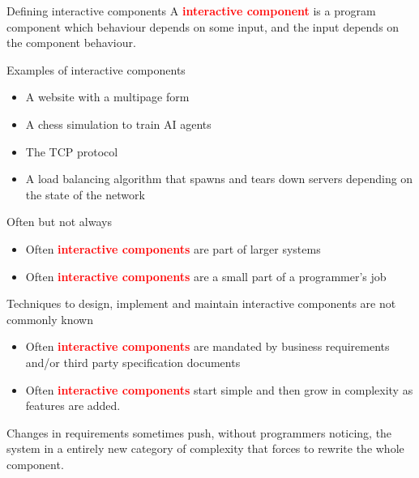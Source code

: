 \documentclass[aspectratio=169,11pt]{beamer}
\begin{document}
\begin{frame}[fragile]{Defining interactive components}
    A \textbf{\textcolor{red}{interactive component}} is a program component which behaviour depends on some input, and the input depends on the component behaviour.

    \centering
{}
\end{frame}

\begin{frame}[fragile]{Examples of interactive components}
    \begin{itemize}
        \item A website with a multipage form
        \item A chess simulation to train AI agents
        \item The TCP protocol 
        \item A load balancing algorithm that spawns and tears down servers depending on the state of the network
    \end{itemize}
\end{frame}

\begin{frame}[fragile]{Often but not always}
    \begin{itemize}
        \item Often \textbf{\textcolor{red}{interactive components}} are part of larger systems
        \item Often \textbf{\textcolor{red}{interactive components}} are a small part of a programmer's job
    \end{itemize}
        Techniques to design, implement and maintain interactive components are not commonly known
    \linebreak
    \begin{itemize}
        \item Often \textbf{\textcolor{red}{interactive components}} are mandated by business requirements and/or third party specification documents
        \item Often  \textbf{\textcolor{red}{interactive components}} start simple and then grow in complexity as features are added. 
    \end{itemize}
       Changes in requirements sometimes push, without programmers noticing, the system in a entirely new category of complexity that forces to rewrite the whole component.
\end{frame}
\end{document}
